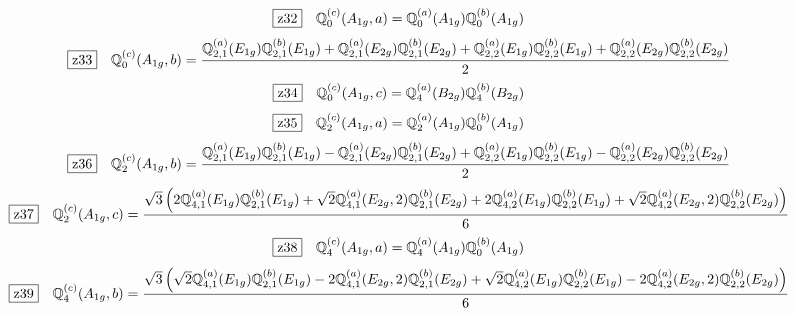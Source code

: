 \documentclass[fleqn,10pt,landscape]{jsarticle}
\begin{document}
\begin{dmath*}
\hspace*{3mm}\fbox{z32}\quad \mathbb{Q}_{0}^{(c)}(A_{1g},a)=\mathbb{Q}_{0}^{(a)}(A_{1g}) \mathbb{Q}_{0}^{(b)}(A_{1g})
\end{dmath*}
\begin{dmath*}
\hspace*{3mm}\fbox{z33}\quad \mathbb{Q}_{0}^{(c)}(A_{1g},b)=\frac{\mathbb{Q}_{2,1}^{(a)}(E_{1g}) \mathbb{Q}_{2,1}^{(b)}(E_{1g}) + \mathbb{Q}_{2,1}^{(a)}(E_{2g}) \mathbb{Q}_{2,1}^{(b)}(E_{2g}) + \mathbb{Q}_{2,2}^{(a)}(E_{1g}) \mathbb{Q}_{2,2}^{(b)}(E_{1g}) + \mathbb{Q}_{2,2}^{(a)}(E_{2g}) \mathbb{Q}_{2,2}^{(b)}(E_{2g})}{2}
\end{dmath*}
\begin{dmath*}
\hspace*{3mm}\fbox{z34}\quad \mathbb{Q}_{0}^{(c)}(A_{1g},c)=\mathbb{Q}_{4}^{(a)}(B_{2g}) \mathbb{Q}_{4}^{(b)}(B_{2g})
\end{dmath*}
\begin{dmath*}
\hspace*{3mm}\fbox{z35}\quad \mathbb{Q}_{2}^{(c)}(A_{1g},a)=\mathbb{Q}_{2}^{(a)}(A_{1g}) \mathbb{Q}_{0}^{(b)}(A_{1g})
\end{dmath*}
\begin{dmath*}
\hspace*{3mm}\fbox{z36}\quad \mathbb{Q}_{2}^{(c)}(A_{1g},b)=\frac{\mathbb{Q}_{2,1}^{(a)}(E_{1g}) \mathbb{Q}_{2,1}^{(b)}(E_{1g}) - \mathbb{Q}_{2,1}^{(a)}(E_{2g}) \mathbb{Q}_{2,1}^{(b)}(E_{2g}) + \mathbb{Q}_{2,2}^{(a)}(E_{1g}) \mathbb{Q}_{2,2}^{(b)}(E_{1g}) - \mathbb{Q}_{2,2}^{(a)}(E_{2g}) \mathbb{Q}_{2,2}^{(b)}(E_{2g})}{2}
\end{dmath*}
\begin{dmath*}
\hspace*{3mm}\fbox{z37}\quad \mathbb{Q}_{2}^{(c)}(A_{1g},c)=\frac{\sqrt{3} \left(2 \mathbb{Q}_{4,1}^{(a)}(E_{1g}) \mathbb{Q}_{2,1}^{(b)}(E_{1g}) + \sqrt{2} \mathbb{Q}_{4,1}^{(a)}(E_{2g},2) \mathbb{Q}_{2,1}^{(b)}(E_{2g}) + 2 \mathbb{Q}_{4,2}^{(a)}(E_{1g}) \mathbb{Q}_{2,2}^{(b)}(E_{1g}) + \sqrt{2} \mathbb{Q}_{4,2}^{(a)}(E_{2g},2) \mathbb{Q}_{2,2}^{(b)}(E_{2g})\right)}{6}
\end{dmath*}
\begin{dmath*}
\hspace*{3mm}\fbox{z38}\quad \mathbb{Q}_{4}^{(c)}(A_{1g},a)=\mathbb{Q}_{4}^{(a)}(A_{1g}) \mathbb{Q}_{0}^{(b)}(A_{1g})
\end{dmath*}
\begin{dmath*}
\hspace*{3mm}\fbox{z39}\quad \mathbb{Q}_{4}^{(c)}(A_{1g},b)=\frac{\sqrt{3} \left(\sqrt{2} \mathbb{Q}_{4,1}^{(a)}(E_{1g}) \mathbb{Q}_{2,1}^{(b)}(E_{1g}) - 2 \mathbb{Q}_{4,1}^{(a)}(E_{2g},2) \mathbb{Q}_{2,1}^{(b)}(E_{2g}) + \sqrt{2} \mathbb{Q}_{4,2}^{(a)}(E_{1g}) \mathbb{Q}_{2,2}^{(b)}(E_{1g}) - 2 \mathbb{Q}_{4,2}^{(a)}(E_{2g},2) \mathbb{Q}_{2,2}^{(b)}(E_{2g})\right)}{6}
\end{dmath*}
\end{document}
